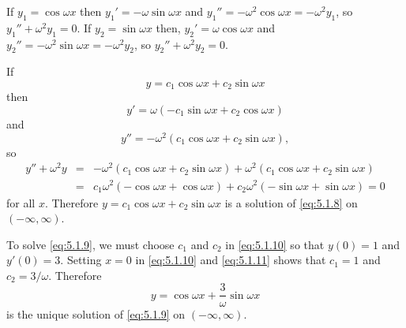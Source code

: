 \begin{examplesolution}
 If $y_{1}=\cos\omega x$ then $y_{1}'=-\omega\sin\omega x$ and
$y_{1}''=-\omega^{2}\cos\omega x=-\omega^{2}y_{1}$, so $y_{1}''+\omega^{2}y_{1}=0$. If
$y_{2}=\sin\omega x$ then, $y_{2}'=\omega\cos\omega x$ and
$y_{2}''=-\omega^{2}\sin\omega x=-\omega^{2}y_{2}$, so $y_{2}''+\omega^{2}y_{2}=0$.

 If
\begin{equation}
  \label{eq:5.1.10}y=c_{1}\cos\omega x+c_{2}\sin\omega x
\end{equation}
then
\begin{equation}
  \label{eq:5.1.11}y'=\omega(-c_{1}\sin\omega x+c_{2}\cos\omega x)
\end{equation}
and
\[
  y''=-\omega^{2}(c_{1}\cos\omega x+c_{2}\sin\omega x),
\]
so
\begin{eqnarray*}
  y''+\omega^{2}y & = & -\omega^{2}(c_{1}\cos\omega x+c_{2}\sin\omega x)+\omega^{2}(c_{1}\cos\omega x+c_{2}\sin\omega x) \\
                  & = & c_{1}\omega^{2}(-\cos\omega x+\cos\omega x)+c_{2}\omega^{2}(-\sin\omega x+\sin\omega x)=0
\end{eqnarray*}
for all $x$. Therefore $y=c_{1}\cos\omega x+c_{2}\sin\omega x$ is a solution of \eqref{eq:5.1.8} on
$(-\infty,\infty)$.

 To solve \eqref{eq:5.1.9}, we must choose $c_{1}$ and $c_{2}$ in
\eqref{eq:5.1.10} so that $y(0)=1$ and $y'(0)=3$. Setting $x=0$ in \eqref{eq:5.1.10} and
\eqref{eq:5.1.11} shows that $c_{1}=1$ and $c_{2}=3/\omega$. Therefore
\[
  y=\cos\omega x+\frac{3}{\omega}\sin\omega x
\]
is the unique solution of \eqref{eq:5.1.9} on $(-\infty,\infty)$. \bbox
\end{examplesolution}

